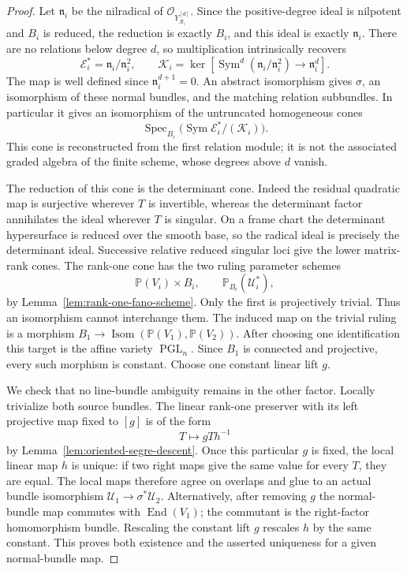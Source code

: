 \documentclass[11pt,reqno]{amsart}
\numberwithin{equation}{section}
\theoremstyle{definition}\newtheorem{definition}[theorem]{Definition}
\theoremstyle{remark}\newtheorem{remark}[theorem]{Remark}
\newcommand{\Pj}{\mathbb P}\newcommand{\A}{\mathbb A}
\newcommand{\OO}{\mathcal O}\newcommand{\II}{\mathcal I}
\DeclareMathOperator{\Sym}{Sym}\DeclareMathOperator{\Gr}{Gr}
\DeclareMathOperator{\Spec}{Spec}\DeclareMathOperator{\PGL}{PGL}
\DeclareMathOperator{\End}{End}
\begin{document}
\begin{proof}
Let \(\mathfrak n_i\) be the nilradical of
\(\OO_{Y_{\mathcal R_i}^{[d]}}\).  Since the positive-degree ideal
is nilpotent and \(B_i\) is reduced, the reduction is exactly \(B_i\),
and this ideal is exactly \(\mathfrak n_i\).  There are no relations
below degree \(d\), so multiplication intrinsically recovers
\begin{equation}\label{eq:moving-intrinsic-kernel-v146}
 \mathcal E_i^*=\mathfrak n_i/\mathfrak n_i^2,
 \qquad
 \mathcal K_i=\ker\left[
 \Sym^d(\mathfrak n_i/\mathfrak n_i^2)
       \longrightarrow\mathfrak n_i^d\right].
\end{equation}
The map is well defined since \(\mathfrak n_i^{d+1}=0\).
An abstract isomorphism gives \(\sigma\), an isomorphism of these
normal bundles, and the matching relation subbundles.  In particular
it gives an isomorphism of the untruncated homogeneous cones
\[
               \Spec_{B_i}\bigl(\Sym\mathcal E_i^*/(\mathcal K_i)\bigr).
\]
This cone is reconstructed from the first relation module; it is not
the associated graded algebra of the finite scheme, whose degrees
above \(d\) vanish.

The reduction of this cone is the determinant cone.  Indeed the
residual quadratic map is surjective wherever \(T\) is invertible,
whereas the determinant factor annihilates the ideal wherever
\(T\) is singular.  On a frame chart the determinant hypersurface
is reduced over the smooth base, so the radical ideal is precisely
the determinant ideal.  Successive relative reduced singular loci
give the lower matrix-rank cones.  The rank-one cone has the two
ruling parameter schemes
\[
             \Pj(V_i)\times B_i,\qquad \Pj_{B_i}(\mathcal U_i^*),
\]
by Lemma~\ref{lem:rank-one-fano-scheme}.  Only the first is
projectively trivial.  Thus an isomorphism cannot interchange them.
The induced map on the trivial ruling is a morphism
\(B_1\to\operatorname{Isom}(\Pj(V_1),\Pj(V_2))\).
After choosing one identification this target is the affine variety
\(\PGL_n\).  Since \(B_1\) is connected and projective, every such
morphism is constant.  Choose one constant linear lift \(g\).

We check that no line-bundle ambiguity remains in the other factor.
Locally trivialize both source bundles.  The linear rank-one
preserver with its left projective map fixed to \([g]\) is of the
form
\begin{equation}\label{eq:moving-normal-map-v146}
                           T\longmapsto gTh^{-1}
\end{equation}
by Lemma~\ref{lem:oriented-segre-descent}.  Once this particular
\(g\) is fixed, the local linear map \(h\) is unique: if two right
maps give the same value for every \(T\), they are equal.  The local
maps therefore agree on overlaps and glue to an actual bundle
isomorphism \(\mathcal U_1\to\sigma^*\mathcal U_2\).  Alternatively,
after removing \(g\) the normal-bundle map commutes with
\(\End(V_1)\); the commutant is the right-factor homomorphism bundle.
Rescaling the constant lift \(g\) rescales \(h\) by the same constant.
This proves both existence and the asserted uniqueness for a given
normal-bundle map.


\end{proof}
\end{document}
